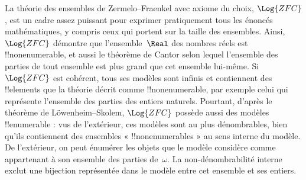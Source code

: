 \documentclass[../../../include/open-logic-section]{subfiles}
\begin{document}
\begin{ex}
La théorie des ensembles de Zermelo--Fraenkel avec axiome du choix,
$\Log{ZFC}$, est un
cadre assez puissant pour exprimer pratiquement tous les énoncés
mathématiques, y compris ceux qui portent sur la taille des
ensembles. Ainsi, $\Log{ZFC}$ démontre que l'ensemble~$\Real$ des
nombres réels est !!{nonenumerable}, et aussi le théorème de Cantor
selon lequel l'ensemble des parties de tout ensemble est plus grand
que cet ensemble lui-même. Si $\Log{ZFC}$ est cohérent, tous ses
modèles sont infinis et contiennent des !!{element}s que la théorie
décrit comme !!{nonenumerable}, par exemple celui qui représente
l'ensemble des parties des entiers naturels. Pourtant, d'après le
théorème de Löwenheim--Skolem, $\Log{ZFC}$ possède aussi des
modèles !!{enumerable} : vus de l'extérieur, ces modèles sont au
plus dénombrables, bien qu'ils contiennent des ensembles «
!!{nonenumerable}s » au sens interne du modèle. De l'extérieur, on
peut énumérer les objets que le modèle considère comme appartenant à
son ensemble des parties de~$\omega$. La non-dénombrabilité interne
exclut une bijection représentée dans le modèle entre cet ensemble
et ses entiers.
\end{ex}
\end{document}
